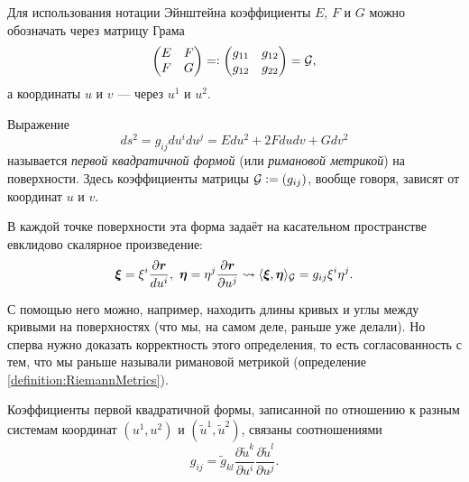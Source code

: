 Для использования нотации Эйнштейна коэффициенты $E$, $F$ и $G$ можно обозначать через матрицу Грама
\[
	\begin{pmatrix}
		E & F\\
		F & G
	\end{pmatrix} = \vcentcolon
	\begin{pmatrix}
		g_{11} & g_{12}\\
		g_{12} & g_{22}
	\end{pmatrix} = \mathcal{G},
\]
а координаты $u$ и $v$ --- через $u^1$ и $u^2$.

\begin{definition}
	Выражение
	\[
		ds^2 = g_{ij}du^idu^j = Edu^2 + 2Fdudv + Gdv^2
	\]
	называется \textit{первой квадратичной формой} (или \textit{римановой метрикой}) на поверхности. Здесь коэффициенты матрицы $\mathcal{G} \vcentcolon = (g_{ij})$, вообще говоря, зависят от координат $u$ и $v$.
\end{definition}

В каждой точке поверхности эта форма задаёт на касательном пространстве евклидово скалярное произведение:
\[
	\vec{\xi} = \xi^i\frac{\partial \vec{r}}{du^i},\ \vec{\eta} = \eta^j\frac{\partial \vec{r}}{\partial u^j} \leadsto \langle\vec{\xi}, \vec{\eta}\rangle_\G = g_{ij}\xi^i\eta^j.
\]

С помощью него можно, например, находить длины кривых и углы между кривыми на поверхностях (что мы, на самом деле, раньше уже делали). Но сперва нужно доказать корректность этого определения, то есть согласованность с тем, что мы раньше называли римановой метрикой (определение \ref{definition:RiemannMetrics}).

\begin{proposition}
	Коэффициенты первой квадратичной формы, записанной по отношению к разным системам координат $(u^1, u^2)$ и $(\widetilde{u}^1, \widetilde{u}^2)$, связаны соотношениями\footnotemark
	\begin{equation} \label{eq:QTensorLaw}
		g_{ij} = \widetilde{g}_{kl}\frac{\partial\widetilde{u}^k}{\partial u^i}\frac{\partial \widetilde{u}^l}{\partial u^j}.
	\end{equation}
\end{proposition}



